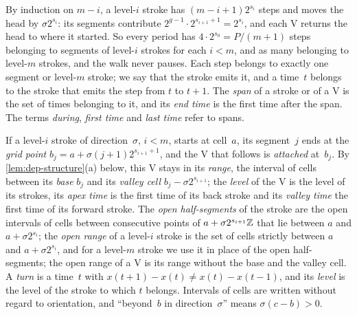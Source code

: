 By induction on $m-i$, a level-$i$ stroke has $(m-i+1)2^{s_i}$ steps and moves the head by $\sigma2^{s_i}$: its
segments contribute $2^{g-1}\cdot2^{s_{i+1}+1}=2^{s_i}$, and each V returns the head to where it started. So every
period has $4\cdot2^{s_0}=P/(m+1)$ steps belonging to segments of level-$i$ strokes for each $i<m$, and as many
belonging to level-$m$ strokes, and the walk never pauses. Each step belongs to exactly one segment or level-$m$
stroke; we say that the stroke emits it, and a time~$t$ belongs to the stroke that emits the step from $t$ to $t+1$.
The \emph{span} of a stroke or of a V is the set of times belonging to it, and its \emph{end time} is the first time
after the span. The terms \emph{during}, \emph{first time} and \emph{last time} refer to spans.

If a level-$i$ stroke of direction~$\sigma$, $i<m$, starts at cell~$a$, its segment~$j$ ends at the \emph{grid point}
$b_j=a+\sigma(j+1)2^{s_{i+1}+1}$, and the V that follows is \emph{attached} at~$b_j$. By
\cref{lem:dep-structure}(a) below, this V stays in its \emph{range}, the interval of cells between its \emph{base}
$b_j$ and its \emph{valley cell} $b_j-\sigma2^{s_{i+1}}$; the \emph{level} of the V is the level of its strokes, its
\emph{apex time} is the first time of its back stroke and its \emph{valley time} the first time of its forward
stroke. The \emph{open half-segments} of the stroke are the open intervals of cells between consecutive points of
$a+\sigma2^{s_{i+1}}\mathbb{Z}$ that lie between $a$ and $a+\sigma2^{s_i}$; the \emph{open range} of a level-$i$ stroke is the set of
cells strictly between $a$ and $a+\sigma2^{s_i}$, and for a level-$m$ stroke we use it in place of the open
half-segments; the open range of a V is its range without the base and the valley cell. A \emph{turn} is a time~$t$ with
$x(t+1)-x(t)\ne x(t)-x(t-1)$, and its \emph{level} is the level of the stroke to which $t$ belongs. Intervals of
cells are written without regard to orientation, and ``beyond~$b$ in direction~$\sigma$'' means $\sigma(c-b)>0$.

